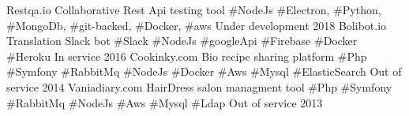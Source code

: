 
\begin{cvhonors}

  \cvhonor
    {Restqa.io} %
    {Collaborative Rest Api testing tool \#NodeJs \#Electron, \#Python,  \#MongoDb, \#git-backed, \#Docker, \#aws} %
    {Under development} %
    {2018} %
  \cvhonor
    {Bolibot.io} %
    {Translation Slack bot \#Slack \#NodeJs \#googleApi \#Firebase \#Docker \#Heroku} %
    {In service} %
    {2016} %
  \cvhonor
    {Cookinky.com} %
    {Bio recipe sharing platform \#Php \#Symfony \#RabbitMq \#NodeJs  \#Docker \#Aws \#Mysql \#ElasticSearch} %
    {Out of service} %
    {2014} %
  \cvhonor
    {Vaniadiary.com} %
    {HairDress salon managment tool \#Php \#Symfony \#RabbitMq \#NodeJs \#Aws \#Mysql \#Ldap} %
    {Out of service} %
    {2013} %

\end{cvhonors}
